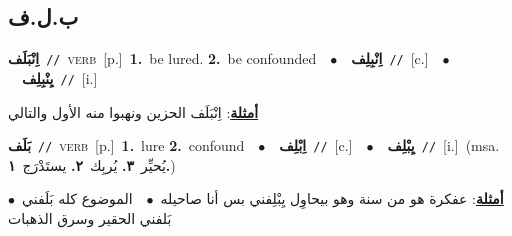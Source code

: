 \documentclass[10pt,a4paper,twoside]{article} %
\begin{document}
\begin{multicols}{2}
\vspace{-3mm}
\subsection*{\color{blue}\foreignlanguage{arabic}{ب.ل.ف}\color{blue}{}} 

{\setlength\topsep{0pt}\textbf{\foreignlanguage{arabic}{اِنْبَلَف}}\ {\color{gray}\texttt{//}\color{black}}\ \textsc{verb}\ [p.]\ \textbf{1.}~be lured.  \textbf{2.}~be confounded\ \ $\bullet$\ \ \setlength\topsep{0pt}\textbf{\foreignlanguage{arabic}{اِنْبِلِف}}\ {\color{gray}\texttt{//}\color{black}}\ [c.]\ \ $\bullet$\ \ \setlength\topsep{0pt}\textbf{\foreignlanguage{arabic}{يِنْبِلِف}}\ {\color{gray}\texttt{//}\color{black}}\ [i.]\  \begin{flushright}\color{gray}\foreignlanguage{arabic}{\textbf{\underline{\foreignlanguage{arabic}{أمثلة}}}: اِنْبَلَف الحزين ونهبوا منه الأول والتالي}\end{flushright}\color{black}} \vspace{2mm}

{\setlength\topsep{0pt}\textbf{\foreignlanguage{arabic}{بَلَف}}\ {\color{gray}\texttt{//}\color{black}}\ \textsc{verb}\ [p.]\ \textbf{1.}~lure  \textbf{2.}~confound\ \ $\bullet$\ \ \setlength\topsep{0pt}\textbf{\foreignlanguage{arabic}{اِبْلِف}}\ {\color{gray}\texttt{//}\color{black}}\ [c.]\ \ $\bullet$\ \ \setlength\topsep{0pt}\textbf{\foreignlanguage{arabic}{يِبْلِف}}\ {\color{gray}\texttt{//}\color{black}}\ [i.]\ \color{gray}(msa. \foreignlanguage{arabic}{يُحيِّر}~\foreignlanguage{arabic}{\textbf{٣.}}  \foreignlanguage{arabic}{يُربِك}~\foreignlanguage{arabic}{\textbf{٢.}}  \foreignlanguage{arabic}{يستَدْرَج}~\foreignlanguage{arabic}{\textbf{١.}})\color{black}\  \begin{flushright}\color{gray}\foreignlanguage{arabic}{\textbf{\underline{\foreignlanguage{arabic}{أمثلة}}}: عفكرة هو من سنة وهو بيحاوِل يِبْلِفني بس أنا صاحيله\ $\bullet$\ \  الموضوع كله بَلَفني\ $\bullet$\ \  بَلفني الحقير وسرق الذهبات}\end{flushright}\color{black}} \vspace{2mm}


\end{multicols}
\end{document}
